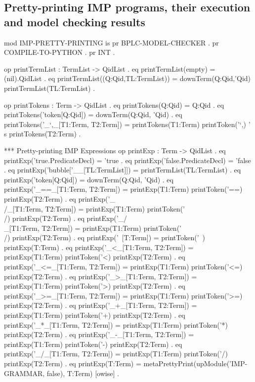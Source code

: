 \documentclass{llncs}%
\begin{document}
\subsection{Pretty-printing IMP programs, their execution and model checking results}

\nwenddocs{}\endmoddef\nwstartdeflinemarkup\nwenddeflinemarkup
mod IMP-PRETTY-PRINTING is
 pr BPLC-MODEL-CHECKER .
 pr COMPILE-TO-PYTHON . 
 pr INT .

 op printTermList : TermList -> QidList .
 eq printTermList(empty) = (nil).QidList .
 eq printTermList((Q:Qid,TL:TermList)) =
    downTerm(Q:Qid,'Qid) printTermList(TL:TermList) .

 op printTokens : Term -> QidList .
 eq printTokens(Q:Qid) = Q:Qid .
 eq printTokens('token[Q:Qid]) = downTerm(Q:Qid, 'Qid) .
 eq printTokens('_`,_[T1:Term, T2:Term]) =
    printTokens(T1:Term) printToken('`,) '\\s printTokens(T2:Term) .

 *** Pretty-printing IMP Expressions
 op printExp : Term -> QidList .
 eq printExp('true.PredicateDecl) = 'true .
 eq printExp('false.PredicateDecl) = 'false .
 eq printExp('bubble['__[TL:TermList]]) = printTermList(TL:TermList) .
 eq printExp('token[Q:Qid]) = downTerm(Q:Qid, 'Qid) .
 eq printExp('_==_[T1:Term, T2:Term]) =
    printExp(T1:Term) printToken('==) printExp(T2:Term) .
 eq printExp('_\\/_[T1:Term, T2:Term]) =
    printExp(T1:Term) printToken('\\/) printExp(T2:Term) .
 eq printExp('_/\\_[T1:Term, T2:Term]) =
    printExp(T1:Term) printToken('\\/) printExp(T2:Term) .
 eq printExp('~[T:Term]) =
    printToken('~) printExp(T:Term) .
 eq printExp('_<_[T1:Term, T2:Term]) =
    printExp(T1:Term) printToken('<) printExp(T2:Term) .
 eq printExp('_<=_[T1:Term, T2:Term]) =
    printExp(T1:Term) printToken('<=) printExp(T2:Term) .
 eq printExp('_>_[T1:Term, T2:Term]) =
    printExp(T1:Term) printToken('>) printExp(T2:Term) .
 eq printExp('_>=_[T1:Term, T2:Term]) =
    printExp(T1:Term) printToken('>=) printExp(T2:Term) .
 eq printExp('_+_[T1:Term, T2:Term]) =
    printExp(T1:Term) printToken('+) printExp(T2:Term) .
 eq printExp('_*_[T1:Term, T2:Term]) =
    printExp(T1:Term) printToken('*) printExp(T2:Term) .
 eq printExp('_-_[T1:Term, T2:Term]) =
    printExp(T1:Term) printToken('-) printExp(T2:Term) .
 eq printExp('_/_[T1:Term, T2:Term]) =
    printExp(T1:Term) printToken('/) printExp(T2:Term) .
 eq printExp(T:Term) =
    metaPrettyPrint(upModule('IMP-GRAMMAR, false), T:Term) [owise] .
\end{document}
